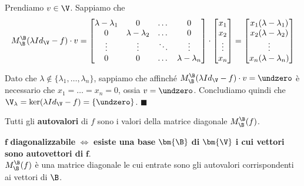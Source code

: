 \documentclass[11pt, a4paper, titlepage, oneside]{scrbook}
\begin{document}
Prendiamo $v \in \V$. Sappiamo che 
\[
M_\B^\B(\lambda Id_\V - f) \cdot v = \begin{bmatrix}
    \lambda - \lambda_1 & 0 & \dots & 0\\
    0 & \lambda - \lambda_2 & \dots & 0 \\ 
    \vdots & \vdots & \ddots & \vdots \\
    0 & 0 & \dots & \lambda - \lambda_n
\end{bmatrix} \cdot \begin{bmatrix}
    x_1 \\
    x_2 \\
    \vdots \\
    x_n
\end{bmatrix} = \begin{bmatrix}
    x_1 (\lambda - \lambda_1) \\
    x_2 (\lambda - \lambda_2) \\
    \vdots \\
    x_n (\lambda - \lambda_n)
\end{bmatrix}
\]

Dato che $\lambda \notin \{\lambda_1, \ldots, \lambda_n\}$, sappiamo che affinché $M_\B^\B(\lambda Id_\V - f) \cdot v = \undzero$ è necessario che $x_1 = \ldots = x_n = 0$, ossia $v = \undzero$. Concludiamo quindi che $\V_\lambda = \ker (\lambda Id_\V - f) = \{\undzero\}$. $\blacksquare$

\begin{Proposizione}[Corollario]
\label{corol-autovalori-matrice}
Tutti gli \textbf{autovalori} di $f$ sono i valori della matrice diagonale $M_\B^\B(f)$.
\end{Proposizione}

\begin{Osservazione}[]
\label{oss-diagonalizzabile-esiste-base}
$\bm{f}$ \textbf{diagonalizzabile} $\iff$ \textbf{esiste una base} $\bm{\B}$ \textbf{di} $\bm{\V}$ \textbf{i cui vettori sono autovettori di} $\bm{f}$. \\
\NB $M_\B^\B(f)$ è una matrice diagonale le cui entrate sono gli autovalori corrispondenti ai vettori di $\B$.
\end{Osservazione}

\Dimostrazione \nopagebreak
\end{document}
